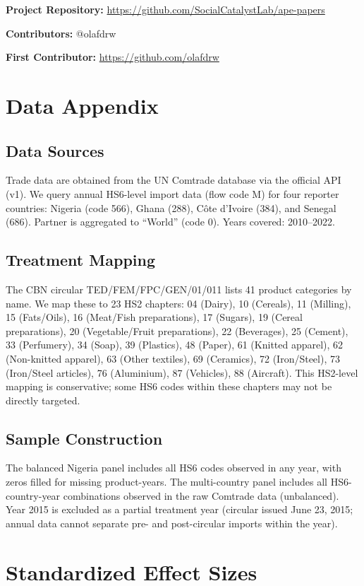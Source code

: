 \documentclass[12pt]{article}
\begin{document}
\noindent\textbf{Project Repository:} \url{https://github.com/SocialCatalystLab/ape-papers}

\noindent\textbf{Contributors:} @olafdrw

\noindent\textbf{First Contributor:} \url{https://github.com/olafdrw}

\label{apep_main_text_end}
\newpage



\newpage
\appendix

\section{Data Appendix}

\subsection{Data Sources}

Trade data are obtained from the UN Comtrade database via the official API (v1). We query annual HS6-level import data (flow code M) for four reporter countries: Nigeria (code 566), Ghana (288), C\^{o}te d'Ivoire (384), and Senegal (686). Partner is aggregated to ``World'' (code 0). Years covered: 2010--2022.

\subsection{Treatment Mapping}

The CBN circular TED/FEM/FPC/GEN/01/011 lists 41 product categories by name. We map these to 23 HS2 chapters: 04 (Dairy), 10 (Cereals), 11 (Milling), 15 (Fats/Oils), 16 (Meat/Fish preparations), 17 (Sugars), 19 (Cereal preparations), 20 (Vegetable/Fruit preparations), 22 (Beverages), 25 (Cement), 33 (Perfumery), 34 (Soap), 39 (Plastics), 48 (Paper), 61 (Knitted apparel), 62 (Non-knitted apparel), 63 (Other textiles), 69 (Ceramics), 72 (Iron/Steel), 73 (Iron/Steel articles), 76 (Aluminium), 87 (Vehicles), 88 (Aircraft). This HS2-level mapping is conservative; some HS6 codes within these chapters may not be directly targeted.

\subsection{Sample Construction}

The balanced Nigeria panel includes all HS6 codes observed in any year, with zeros filled for missing product-years. The multi-country panel includes all HS6-country-year combinations observed in the raw Comtrade data (unbalanced). Year 2015 is excluded as a partial treatment year (circular issued June 23, 2015; annual data cannot separate pre- and post-circular imports within the year).

\section{Standardized Effect Sizes}
\label{sec:sde}


\end{document}
